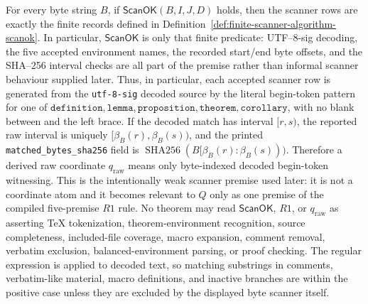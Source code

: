 \documentclass[runningheads]{llncs}
\DeclareRobustCommand{\auditcode}[1]{\mbox{\normalfont\ttfamily\detokenize{#1}}}
\newcommand{\ScanOK}{\mathsf{ScanOK}}
\newcommand{\rawBeginTokenCoord}{q_{\mathrm{raw}}}
\newcommand{\qlex}{\rawBeginTokenCoord}
\begin{document}
\begin{lemma}
\label{lem:operative-raw-scan-soundness}
For every byte string \(B\), if
\(\ScanOK(B,I,J,D)\) holds, then the scanner rows are exactly the finite records
defined in Definition~\ref{def:finite-scanner-algorithm-scanok}.  In
particular, \(\ScanOK\) is only that finite predicate: UTF--8-sig decoding, the
five accepted environment names, the recorded start/end byte offsets, and the
SHA--256 interval checks are all part of the premise rather than informal
scanner behaviour supplied later.  Thus, in
particular, each accepted scanner row is generated from the \texttt{utf-8-sig}
decoded source by the literal begin-token pattern
\auditcode{\\begin\{e\}} for one of
\(\texttt{definition},\texttt{lemma},\texttt{proposition},\texttt{theorem},
\texttt{corollary}\), with no blank between \auditcode{\\begin} and the left
brace.  If the decoded match has interval \([r,s)\), the reported raw interval
is uniquely \([\beta_B(r),\beta_B(s))\), and the printed
\texttt{matched\_bytes\_sha256} field is
\(\operatorname{SHA256}(B[\beta_B(r):\beta_B(s)))\).  Therefore a derived raw
coordinate \(\qlex\) means only byte-indexed decoded begin-token witnessing.
This is the intentionally weak scanner premise used later: it is not a
coordinate atom and it becomes relevant to \(Q\) only as one premise of the
compiled five-premise \(R1\) rule.  No theorem may read \(\ScanOK\), \(R1\), or
\(\qlex\) as asserting \TeX{} tokenization, theorem-environment recognition,
source completeness, included-file coverage, macro expansion, comment removal,
verbatim exclusion, balanced-environment parsing, or proof checking.  The
regular expression is applied to decoded text, so matching substrings in
comments, verbatim-like material, macro definitions, and inactive branches are
within the positive case unless they are excluded by the displayed byte scanner
itself.
\end{lemma}
\end{document}
